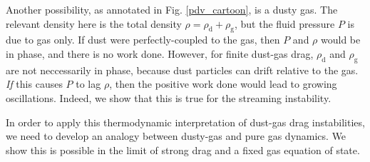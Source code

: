 \documentclass[iop, numberedappendix]{emulateapj}
\newcommand{\rhod}{\rho_\mathrm{d}}
\newcommand{\rhog}{\rho_\mathrm{g}}
\begin{document}

Another possibility, as annotated in Fig. \ref{pdv_cartoon}, is a dusty gas. The
relevant density here is the total density $\rho = \rhod + \rhog$, 
but the fluid pressure $P$ is due to gas only. If dust were 
perfectly-coupled to the gas, then $P$ and $\rho$ would be in phase, 
and there is no work done. However, for finite dust-gas drag, $\rhod$ and
$\rhog$ are not neccessarily in phase, because dust particles can
drift relative to the gas.   
\emph{If} this causes $P$ to lag 
$\rho$, then the positive work done would lead to growing
oscillations. Indeed, we show that this is true for the streaming
instability. 

In order to apply this thermodynamic interpretation of dust-gas drag
instabilities, we need to develop an analogy between dusty-gas
and pure gas dynamics. We show this is possible in the limit of
strong drag and a fixed gas equation of state. 







\appendix




\end{document}
